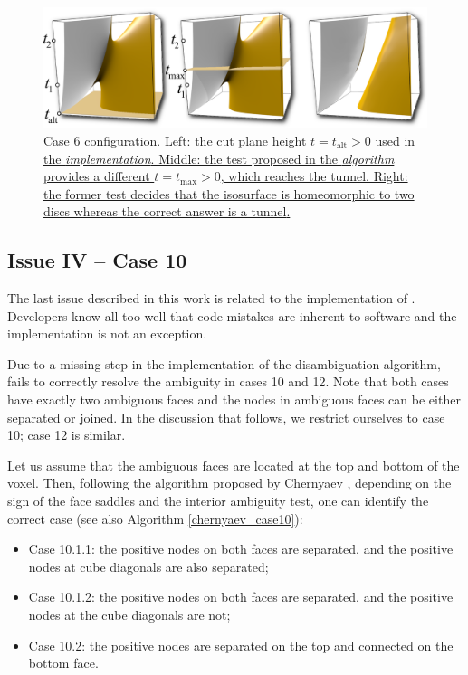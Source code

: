 \begin{figure}[b]
     \centering
    \includegraphics[width=0.95\linewidth]{chapter4/figures/height-plane-problem.png}
     \caption{\href{http://liscustodio.github.io/C_MC33/figure9.html}{\label{interior_test}Case 6 configuration.
     Left: the cut plane height $t = t_{\mathrm{alt}} > 0$ used in the \mc{} \emph{implementation}. Middle: the test proposed in the \mc{} \emph{algorithm} provides a different $t = t_{\mathrm{max}}> 0$, which reaches the tunnel. Right: the former test decides that the isosurface is homeomorphic to two discs whereas the correct answer is a tunnel\cite{lisOnline2013}.}}
\end{figure}

\subsection{Issue IV -- Case 10}
\label{erros_cause:lewiner}

The last issue described in this work is related to the implementation of \mc{}.
Developers know all too well that code mistakes are inherent to software and the \mc{} implementation is not an exception.

Due to a missing step in the implementation of the disambiguation algorithm, \mc{} fails to correctly resolve the ambiguity in cases 10 and 12. Note that both cases have exactly two ambiguous faces and the nodes in ambiguous faces can be either separated or joined. In the discussion that follows, we restrict ourselves to case 10; case 12 is similar. 

Let us assume that the ambiguous faces are located at the top and bottom of the voxel. Then, following the algorithm proposed by Chernyaev \cite{Chernyaev95marchingcubes}, depending on the sign of the face saddles and the interior ambiguity test, one can identify the correct case (see also Algorithm \ref{chernyaev_case10}):
\begin{itemize}
\item Case 10.1.1: the positive nodes on both faces are separated, and the positive nodes at cube diagonals are also separated;
\item Case 10.1.2: the positive nodes on both faces are separated, and the positive nodes at the cube diagonals are not;
\item Case 10.2: the positive nodes are separated on the top and connected on the bottom face.
\end{itemize}


